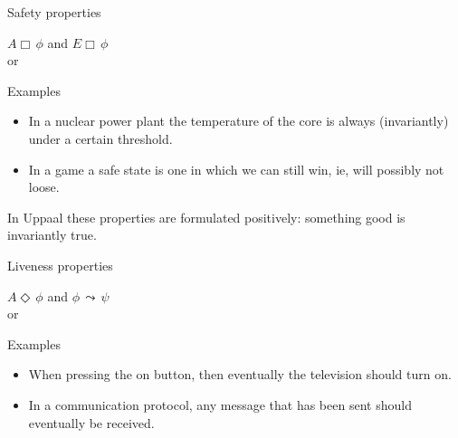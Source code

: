 \documentclass[aspectratio=169]{beamer}
\begin{document}
\begin{slide}{Safety properties}
\small

\begin{block}{$A \Box\, \phi$ and $E \Box\, \phi$}
\vspace{5mm}
\\
 or 
\vspace{5mm}

Examples\\
\begin{itemize}
\item \alert{In a nuclear power plant the temperature of the core is always (invariantly) under a certain threshold}.
\item \alert{In a game a safe state is one in which we can still win, ie, will possibly not loose}.
\end{itemize}

In Uppaal these properties are formulated positively: something good is invariantly true.
\end{block}

\end{slide}

\begin{slide}{Liveness properties}
\small

\begin{block}{$A \Diamond\, \phi$ and $\phi\, \leadsto \, \psi$}
\vspace{5mm}
\\
 or 
\vspace{5mm}

Examples\\
\begin{itemize}
\item \alert{When pressing the on button, then eventually the television should turn on}.
\item \alert{In a communication protocol, any message that has been sent should eventually be received}.
\end{itemize}

\end{block}

\end{slide}
\end{document}
